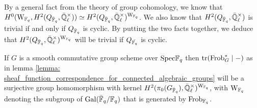             \begin{corollary} \label{coro: kernels_of_traces_of_frobenii_on_etale_group_schemes}
                By a general fact from the theory of group cohomology, we know that $H^0(\rmW_{\F_q}, H^2(Q_{\bar{\F}_q}, \bar{\Q}_{\ell}^{\x})) \cong H^2(Q_{\bar{\F}_q}, \bar{\Q}_{\ell}^{\x})^{\rmW_{\F_q}}$. We also know that $H^2(Q_{\bar{\F}_q}, \bar{\Q}_{\ell}^{\x})$ is trivial if and only if $Q_{\bar{\mathbb{F}}_q}$ is cyclic. By putting the two facts together, we deduce that $H^2(Q_{\bar{\F}_q}, \bar{\Q}_{\ell}^{\x})^{\rmW_{\F_q}}$ will be trivial if $Q_{\bar{\mathbb{F}_q}}$ is cyclic. 
            \end{corollary}
            \begin{theorem} \label{theorem: sheaf_function_correspondence_for_smooth_groups}
                \cite[Theorem 3.6]{cunningham_roe_function_sheaf_dictionary_quasi_characters_p_adic_tori} If $G$ is a smooth commutative group scheme over $\mathrm{Spec} \mathbb{F}_q$ then $\operatorname{tr}(\mathrm{Frob}_G^* \mid -)$ as in lemma \ref{lemma: sheaf_function_correspondence_for_connected_algebraic_groups} will be a surjective group homomorphism with kernel $H^2(\pi_0(G_{\bar{\F}_q}), \bar{\Q}_{\ell}^{\x})^{\rmW_{\F_q}}$, with $\mathrm{W}_{\mathbb{F}_q}$ denoting the subgroup of $\mathrm{Gal}(\bar{\mathbb{F}}_q/\mathbb{F}_q)$ that is generated by $\mathrm{Frob}_{\mathbb{F}_q}$.
            \end{theorem}

